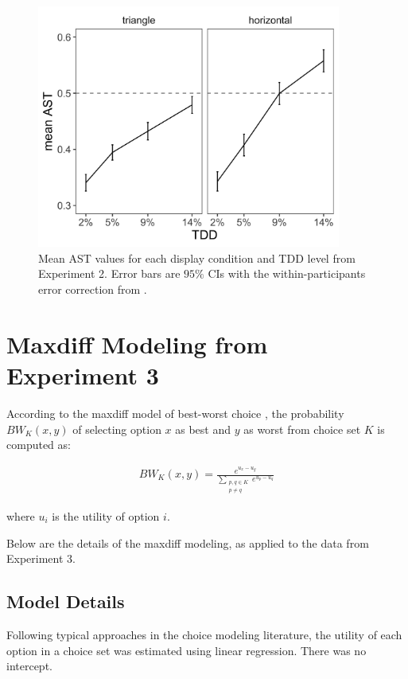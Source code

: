 \begin{figure}
    \centering
   \includegraphics[width=100mm]{figures/choicePhase_mean_ast.jpeg}
   \caption{Mean AST values for each display condition and TDD level from Experiment 2. Error bars are $95\%$ CIs with the within-participants error correction from \textcite{cousineau2014error}.}
   \label{fig:e2_ast}
\end{figure}

\chapter{Maxdiff Modeling from Experiment 3}
According to the maxdiff model of best-worst choice \parencite{marleyProbabilisticModelsBest2005}, the probability $BW_{K}(x,y)$ of selecting option $x$ as best and $y$ as worst from choice set $K$ is computed as:

\begin{equation}
   \begin{aligned}
   BW_{K}(x,y)=\frac{e^{u_{x}-u_{y}}}{\sum_{\substack{{p,q}\in K\\p \neq q}} e^{u_{p}-u_{q}}}   
   \label{eqn:maxdiff_equation1}
   \end{aligned}
\end{equation}

where $u_{i}$ is the utility of option $i$. 

Below are the details of the maxdiff modeling, as applied to the data from Experiment 3.

\section{Model Details}
Following typical approaches in the choice modeling literature, the utility of each option in a choice set was estimated using linear regression. There was no intercept.

